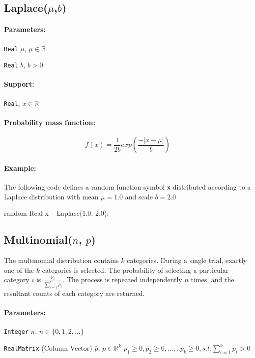 \subsection{Laplace($\mu$,$b$)}

\paragraph*{Parameters:} 
\begin{itemize*}
\item[] \verb|Real| $\mu$, $\mu \in \mathbb{R}$
\item[] \verb|Real| $b$, $b > 0$
 
\end{itemize*}
\paragraph*{Support:} \verb|Real|, $x \in \mathbb{R}$ 

\paragraph*{Probability mass function:}
\[
	f(x) = \frac{1}{2b} exp(\frac{-|x-\mu|}{b})
\]

\paragraph*{Example:}
The following code defines a random function symbol \verb|x| distributed according to a Laplace distribution with mean $\mu = 1.0$ and scale $b = 2.0$
\begin{blogcode}
random Real x ~ Laplace(1.0, 2.0);
\end{blogcode}


\subsection{Multinomial($n$, $\bar{p}$)}
 The multinomial distribution contains $k$ categories. During a single trial, exactly one of the $k$ categories is selected. The probability of selecting a particular category $i$ is $\frac{p_{i}}{\sum_{i=1}^{k} p_{i}}$. The process is repeated independently $n$ times, and the resultant counts of each category are returned.
 
\paragraph*{Parameters:} 
\begin{itemize*}
\item[] \verb|Integer| $n$, $n \in \{0, 1, 2, \ldots \}$
\item[] \verb|RealMatrix| (Column Vector) $\bar{p}$, $p \in \mathbb{R}^{k}$ $p_{1} \geq 0, p_{2} \geq 0, \ldots, .. p_{k} \geq 0, s.t. \sum_{i=1}^{k} p_{i} > 0$
\end{itemize*}

